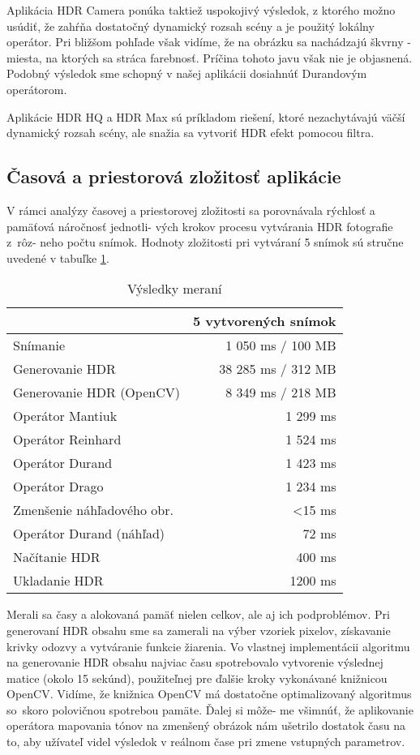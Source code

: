 \documentclass[slovak]{ExcelAtFIT}
\begin{document}
Aplikácia HDR Camera ponúka taktiež uspokojivý výsledok, z ktorého možno usúdiť,
že zahŕňa dostatočný dynamický rozsah scény a je použitý lokálny operátor. Pri bližšom pohľade však vidíme,
že na obrázku sa nachádzajú škvrny - miesta, na ktorých sa stráca farebnosť. Príčina tohoto javu však nie je
objasnená. Podobný výsledok sme schopný v našej aplikácii dosiahnúť Durandovým operátorom.

Aplikácie HDR HQ a HDR Max sú príkladom riešení, ktoré nezachytávajú väčší dynamický rozsah scény, ale snažia
sa vytvoriť HDR efekt pomocou filtra.

\subsection{Časová a priestorová zložitosť aplikácie}
\label{sec:Result-Computation}

V rámci analýzy časovej a priestorovej zložitosti sa porovnávala rýchlosť a pamäťová náročnosť jednotli- vých krokov
procesu vytvárania HDR fotografie z~rôz- neho počtu snímok. Hodnoty zložitosti pri vytváraní 5 snímok sú stručne uvedené
v tabuľke \ref{tab:ResultTable}.

\begin{table}[t]
	\vskip6pt
	\caption{Výsledky meraní}
	\centering
	\begin{tabular}{l r}
		\toprule
		 & 5 vytvorených snímok \\
		\midrule
		Snímanie & 1 050 ms / 100 MB \\
		Generovanie HDR & 38 285 ms / 312 MB \\
		Generovanie HDR (OpenCV) & 8 349 ms / 218 MB \\
		Operátor Mantiuk & 1 299 ms \\
		Operátor Reinhard & 1 524 ms \\
		Operátor Durand & 1 423 ms \\
		Operátor Drago & 1 234 ms \\
		Zmenšenie náhľadového obr. & \textless 15 ms \\
		Operátor Durand (náhľad) & 72 ms \\
		Načítanie HDR & 400 ms \\
		Ukladanie HDR & 1200 ms \\
		\bottomrule
	\end{tabular}
	\label{tab:ResultTable}
\end{table}

Merali sa časy a alokovaná pamäť nielen celkov, ale aj ich podproblémov. Pri generovaní HDR obsahu sme sa zamerali
na výber vzoriek pixelov, získavanie krivky odozvy a vytváranie funkcie žiarenia. Vo vlastnej implementácii algoritmu
na generovanie HDR obsahu najviac času spotrebovalo vytvorenie výslednej matice (okolo 15 sekúnd), použiteľnej
pre ďalšie kroky vykonávané knižnicou OpenCV. Vidíme, že knižnica OpenCV má dostatočne optimalizovaný algoritmus
so~skoro polovičnou spotrebou pamäte. Ďalej si môže- me všimnúť, že aplikovanie operátora mapovania tónov na zmenšený
obrázok nám ušetrilo dostatok času na to, aby užívateľ videl výsledok v reálnom čase pri zmene vstupných parametrov.
\end{document}
